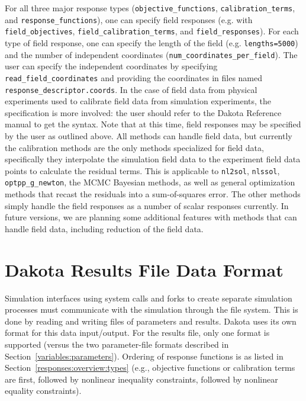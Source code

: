 For all three major response 
types (\texttt{objective\_functions}, \texttt{calibration\_terms}, and \texttt{response\_functions}), one can specify field responses (e.g. with \texttt{field\_objectives}, \texttt{field\_calibration\_terms}, and \texttt{field\_responses}).  
For each type of field response, one can specify the length of the field (e.g. \texttt{lengths=5000}) and the number of independent coordinates (\texttt{num\_coordinates\_per\_field}).  The user can specify the independent coordinates by specifying \texttt{read\_field\_coordinates} and providing the 
coordinates in files named \texttt{response\_descriptor.coords}.  In the case of field data from physical experiments used to calibrate field data from simulation experiments, the specification is more involved:  the user should refer to the Dakota Reference manual to get the syntax. 
Note that at this time, field responses may be specified by the user as outlined above.  All methods can handle field data, but currently the calibration methods are the only methods specialized for field data, specifically they interpolate the simulation field data to the experiment field data points to calculate the residual terms.  This is applicable to \texttt{nl2sol}, \texttt{nlssol}, \texttt{optpp\_g\_newton}, 
the MCMC Bayesian methods, as well as general optimization methods that recast the residuals into a sum-of-squares error.  The other methods simply handle the field responses as a number of scalar responses currently. In future versions, we are planning some additional features with methods 
that can handle field data, including reduction of the field data. 
 
\section{Dakota Results File Data Format}\label{responses:results}

Simulation interfaces using system calls and forks to create
separate simulation processes must communicate with the simulation
through the file system. This is done by reading and
writing files of parameters and results. Dakota uses its own format
for this data input/output. For the results file, only one format is
supported (versus the two parameter-file formats described in
Section~\ref{variables:parameters}). Ordering of response functions is
as listed in Section~\ref{responses:overview:types} (e.g., objective
functions or calibration terms are first, followed by nonlinear
inequality constraints, followed by nonlinear equality constraints).

